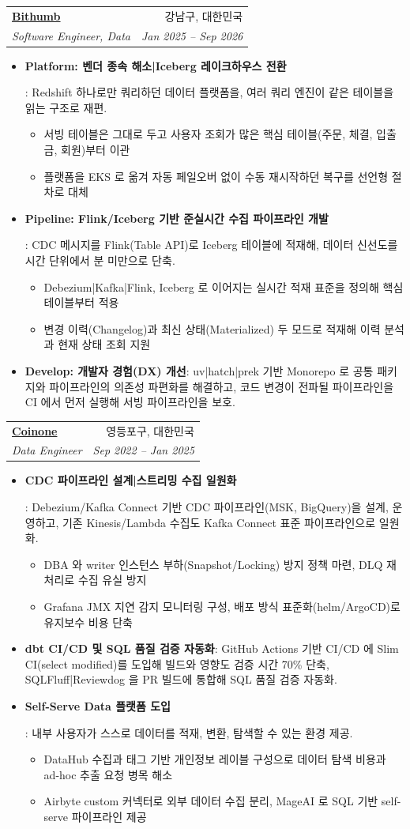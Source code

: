 \documentclass[letterpaper,12pt]{article}
\makeatletter
\newcommand{\resumeItem}[2]{
  \item\small{
    \textbf{#1}{: #2 \vspace{-2pt}}
  }
}
\newcommand{\resumeSubheading}[4]{
  \vspace{-1pt}\item
    \begin{tabular*}{0.97\textwidth}[t]{l@{\extracolsep{\fill}}r}
      \textbf{#1} & #2 \\
      \textit{\small#3} & \textit{\small #4} \\
    \end{tabular*}\vspace{-5pt}
}
\newcommand{\resumeItemListStart}{\begin{itemize}[leftmargin=*, itemsep=3pt, topsep=3pt, parsep=0pt]}
\newcommand{\resumeItemListEnd}{\end{itemize}\vspace{-2pt}}
\newcommand{\resumeSubItemListStart}{\begin{itemize}[leftmargin=1.5em, itemsep=3pt, topsep=3pt, parsep=0pt]}
\newcommand{\resumeSubItemListEnd}{\end{itemize}\vspace{-2pt}}
\makeatother
\begin{document}
    \resumeSubheading
      {\href{https://bithumbcorp.com/ko}{Bithumb}}{강남구, 대한민국}
      {Software Engineer, Data}{Jan 2025 -- Sep 2026}
      \resumeItemListStart
        \resumeItem{Platform: 벤더 종속 해소|Iceberg 레이크하우스 전환}
          {
            Redshift 하나로만 쿼리하던 데이터 플랫폼을, 여러 쿼리 엔진이 같은 테이블을 읽는 구조로 재편.
            \resumeSubItemListStart
              \item 서빙 테이블은 그대로 두고 사용자 조회가 많은 핵심 테이블(주문, 체결, 입출금, 회원)부터 이관
              \item 플랫폼을 EKS 로 옮겨 자동 페일오버 없이 수동 재시작하던 복구를 선언형 절차로 대체
            \resumeSubItemListEnd
          }
        \resumeItem{Pipeline: Flink/Iceberg 기반 준실시간 수집 파이프라인 개발}
          {
            CDC 메시지를 Flink(Table API)로 Iceberg 테이블에 적재해, 데이터 신선도를 시간 단위에서 분 미만으로 단축.
            \resumeSubItemListStart
              \item Debezium|Kafka|Flink, Iceberg 로 이어지는 실시간 적재 표준을 정의해 핵심 테이블부터 적용
              \item 변경 이력(Changelog)과 최신 상태(Materialized) 두 모드로 적재해 이력 분석과 현재 상태 조회 지원
            \resumeSubItemListEnd
          }
        \resumeItem{Develop: 개발자 경험(DX) 개선}
          {
            uv|hatch|prek 기반 Monorepo 로 공통 패키지와 파이프라인의 의존성 파편화를 해결하고, 코드 변경이 전파될 파이프라인을 CI 에서 먼저 실행해 서빙 파이프라인을 보호.
          }
      \resumeItemListEnd
      
    \resumeSubheading
      {\href{https://coinonecorp.com}{Coinone}}{영등포구, 대한민국}
      {Data Engineer}{Sep 2022 -- Jan 2025}
      \resumeItemListStart
        \resumeItem{CDC 파이프라인 설계|스트리밍 수집 일원화}
          {
            Debezium/Kafka Connect 기반 CDC 파이프라인(MSK, BigQuery)을 설계, 운영하고, 기존 Kinesis/Lambda 수집도 Kafka Connect 표준 파이프라인으로 일원화.
            \resumeSubItemListStart
              \item DBA 와 writer 인스턴스 부하(Snapshot/Locking) 방지 정책 마련, DLQ 재처리로 수집 유실 방지
              \item Grafana JMX 지연 감지 모니터링 구성, 배포 방식 표준화(helm/ArgoCD)로 유지보수 비용 단축
            \resumeSubItemListEnd
          }
        \resumeItem{dbt CI/CD 및 SQL 품질 검증 자동화}
          {
            GitHub Actions 기반 CI/CD 에 Slim CI(select modified)를 도입해 빌드와 영향도 검증 시간 70\% 단축, SQLFluff|Reviewdog 을 PR 빌드에 통합해 SQL 품질 검증 자동화.
          }
        \resumeItem{Self-Serve Data 플랫폼 도입}
          {
            내부 사용자가 스스로 데이터를 적재, 변환, 탐색할 수 있는 환경 제공.
            \resumeSubItemListStart
              \item DataHub 수집과 태그 기반 개인정보 레이블 구성으로 데이터 탐색 비용과 ad-hoc 추출 요청 병목 해소
              \item Airbyte custom 커넥터로 외부 데이터 수집 분리, MageAI 로 SQL 기반 self-serve 파이프라인 제공
            \resumeSubItemListEnd
          }
      \resumeItemListEnd
\end{document}
